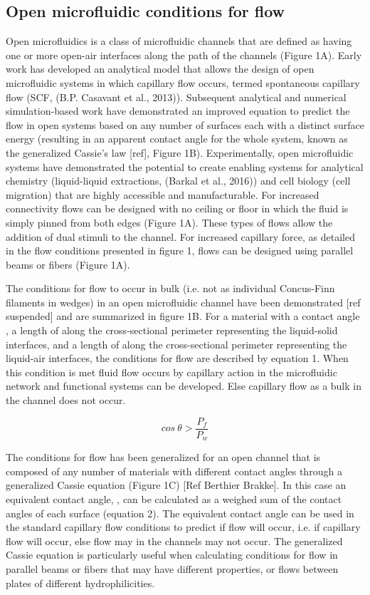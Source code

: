 \subsection{Open microfluidic conditions for flow}
Open microfluidics is a class of microfluidic channels that are defined as having one or more open-air interfaces along the path of the channels (Figure 1A). Early work has developed an analytical model that allows the design of open microfluidic systems in which capillary flow occurs, termed spontaneous capillary flow (SCF, (B.P. Casavant et al., 2013)). Subsequent analytical and numerical simulation-based work have demonstrated an improved equation to predict the flow in open systems based on any number of surfaces each with a distinct surface energy (resulting in an apparent contact angle for the whole system, known as the generalized Cassie’s law [ref], Figure 1B). Experimentally, open microfluidic systems have demonstrated the potential to create enabling systems for analytical chemistry (liquid-liquid extractions, (Barkal et al., 2016)) and cell biology (cell migration) that are highly accessible and manufacturable. For increased connectivity flows can be designed with no ceiling or floor in which the fluid is simply pinned from both edges (Figure 1A). These types of flows allow the addition of dual stimuli to the channel. For increased capillary force, as detailed in the flow conditions presented in figure 1, flows can be designed using parallel beams or fibers (Figure 1A).

The conditions for flow to occur in bulk (i.e. not as individual Concus-Finn filaments in wedges) in an open microfluidic channel have been demonstrated [ref suspended] and are summarized in figure 1B. For a material with a contact angle , a length of   along the cross-sectional perimeter representing the liquid-solid interfaces, and a length of  along the cross-sectional perimeter representing the liquid-air interfaces, the conditions for flow are described by equation 1. When this condition is met fluid flow occurs by capillary action in the microfluidic network and functional systems can be developed. Else capillary flow as a bulk in the channel does not occur. 

\begin{equation}
    cos\ \theta> \frac{P_f}{P_w}
\end{equation}

The conditions for flow has been generalized for an open channel that is composed of any number of materials with different contact angles through a generalized Cassie equation (Figure 1C) [Ref Berthier Brakke]. In this case an equivalent contact angle, , can be calculated as a weighed sum of the contact angles of each surface (equation 2). The equivalent contact angle  can be used in the standard capillary flow conditions to predict if flow will occur, i.e. if  capillary flow will occur, else flow may in the channels may not occur. The generalized Cassie equation is particularly useful when calculating conditions for flow in parallel beams or fibers that may have different properties, or flows between plates of different hydrophilicities.

